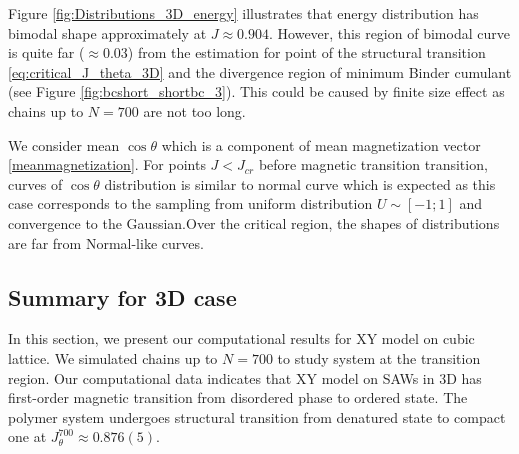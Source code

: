 Figure \ref{fig:Distributions_3D_energy} illustrates that energy distribution has bimodal shape approximately at $J \approx 0.904$. However, this region of bimodal curve is quite far ($\approx 0.03$) from the estimation for point of the structural transition \eqref{eq:critical_J_theta_3D} and the divergence region of minimum Binder cumulant (see Figure \ref{fig:bcshort_shortbc_3}). This could be caused by finite size effect as chains up to $N=700$ are not too long. 

We consider mean $\cos \theta$ which is a component of mean magnetization vector \eqref{meanmagnetization}. For points $J < J_{cr}$ before magnetic transition
transition, curves of $\cos \theta$ distribution is similar to normal curve which
is expected as this case corresponds to the sampling from uniform distribution $U \sim [-1;1]$ and convergence to the Gaussian.Over the critical region, the shapes of distributions are far from Normal-like curves. 

\subsection{Summary for 3D case}
 In this section, we present our computational results for XY model on cubic lattice. We simulated chains up to $N=700$ to study system at the transition region. Our computational data indicates that XY model on SAWs in 3D has first-order magnetic transition from disordered phase to ordered state. The polymer system undergoes structural transition from denatured state to compact one at $J_{\theta}^{700} \approx  0.876(5)$. 
